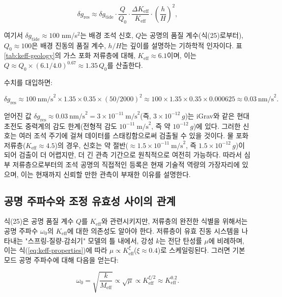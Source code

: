 \documentclass[12pt,a4paper]{article}
\theoremstyle{remark}
\newcommand{\Keff}{K_{\mathrm{eff}}}
\begin{document}
	\begin{equation}
		\delta g_{\text{res}} \approx \delta g_{\text{tide}} \cdot \frac{Q}{Q_0} \cdot \frac{\Delta \Keff}{\Keff} \cdot \left(\frac{h}{H}\right)^2,
		\label{eq:signal_estimate}
	\end{equation}
	
	여기서 \(\delta g_{\text{tide}} \approx 100\) nm/s\(^2\)는 배경 조석 신호, \(Q\)는 공명의 품질 계수(식(25)로부터), \(Q_0 \approx 100\)은 배경 진동의 품질 계수, \(h/H\)는 깊이를 설명하는 기하학적 인자이다. 표 \ref{tab:keff-geology}의 가스 포화 저류층에 대해, \(\Keff \approx 6.1\)이며, 이는 \(Q \approx Q_0 \times (6.1/4.0)^{0.67} \approx 1.35\,Q_0\)를 산출한다.
	
	수치를 대입하면:
	
	\[
	\delta g_{\text{res}} \approx 100\ \text{nm/s}^2 \times 1.35 \times 0.35 \times (50/2000)^2 \approx 100 \times 1.35 \times 0.35 \times 0.000625 \approx 0.03\ \text{nm/s}^2.
	\]
	
	얻어진 값 \(\delta g_{\text{res}} \approx 0.03\ \text{nm/s}^2 = 3 \times 10^{-11}\ \text{m/s}^2\)(즉, \(3 \times 10^{-12}\ g\))는 iGrav와 같은 현대 초전도 중력계의 감도 한계(전형적 감도 \(10^{-11}\ \text{m/s}^2\), 즉 약 \(10^{-12}\ g\))에 있다. 그러한 신호는 여러 조석 주기에 걸쳐 데이터를 스태킹함으로써 검출될 수 있을 것이다. 물 포화 저류층(\(\Keff \approx 4.5\))의 경우, 신호는 약 절반(\( \approx 1.5\times10^{-11}\ \text{m/s}^2\), 즉 \(1.5\times10^{-12}\ g\))이 되어 검출이 더 어렵지만, 더 긴 관측 기간으로 원칙적으로 여전히 가능하다. 따라서 심부 저류층으로부터의 조석 공명의 직접적인 등록은 현재 기술적 역량의 가장자리에 있으며, 이는 현재까지 신뢰할 만한 관측이 부재한 이유를 설명한다.
	
	\subsection{공명 주파수와 조정 유효성 사이의 관계}
	\label{subsec:frequency_keff}
	
	식(25)은 공명 품질 계수 \(Q\)를 \(\Keff\)와 관련시키지만, 저류층의 완전한 식별을 위해서는 공명 주파수 \(\omega_0\)의 \(\Keff\)에 대한 의존성도 알아야 한다. 저류층이 유효 진동 시스템을 나타내는 "스프링-질량-감쇠기" 모델의 틀 내에서, 강성 \(k\)는 전단 탄성률 \(\mu\)에 비례하며, 이는 식(\ref{eq:keff-properties})에 따라 \(\mu \propto \Keff^{\xi}\)(\(\xi \approx 0.4\))로 스케일링된다. 그러면 기본 모드 공명 주파수에 대해 다음을 얻는다:
	
	\begin{equation}
		\omega_0 = \sqrt{\frac{k}{M_{\text{eff}}}} \propto \sqrt{\mu} \propto \Keff^{\xi/2} \approx \Keff^{0.2}.
		\label{eq:omega_keff}
	\end{equation}
	
\end{document}
